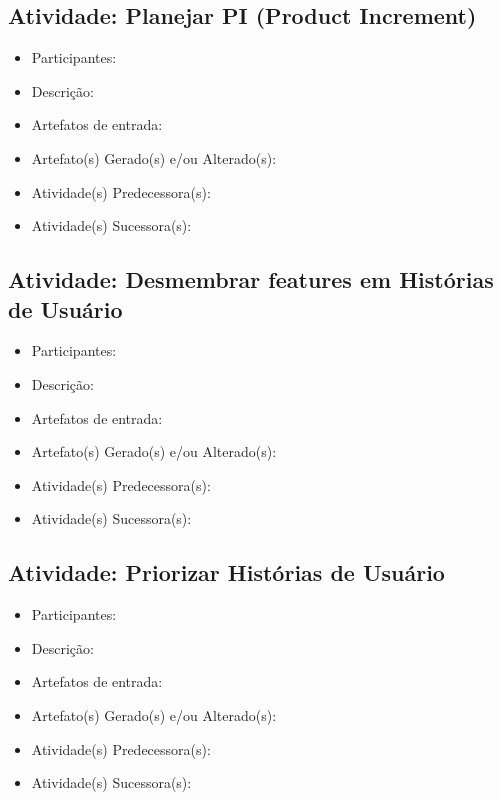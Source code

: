 \subsection{Atividade: Planejar PI (Product Increment)}
\begin{itemize}
\item Participantes: 

\item Descrição: 

\item Artefatos de entrada: 

\item Artefato(s) Gerado(s) e/ou Alterado(s): 

\item Atividade(s) Predecessora(s): 
  
\item Atividade(s) Sucessora(s): 
\end{itemize}



\subsection{Atividade: Desmembrar features em Histórias de Usuário}
\begin{itemize}
\item Participantes: 

\item Descrição: 

\item Artefatos de entrada: 

\item Artefato(s) Gerado(s) e/ou Alterado(s): 

\item Atividade(s) Predecessora(s): 
  
\item Atividade(s) Sucessora(s): 
\end{itemize}

\subsection{Atividade: Priorizar Histórias de Usuário}
\begin{itemize}
\item Participantes: 

\item Descrição: 

\item Artefatos de entrada: 

\item Artefato(s) Gerado(s) e/ou Alterado(s): 

\item Atividade(s) Predecessora(s): 
  
\item Atividade(s) Sucessora(s): 
\end{itemize}

